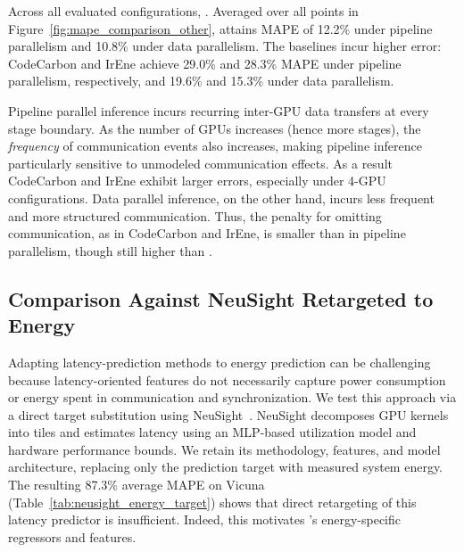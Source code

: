 Across all evaluated configurations, .
Averaged over all points in Figure~\ref{fig:mape_comparison_other}, \sys{} attains MAPE of 12.2\% under pipeline parallelism and 10.8\% under data parallelism.
The baselines incur higher error: CodeCarbon and IrEne achieve 29.0\% and 28.3\% MAPE under pipeline parallelism, respectively, and 19.6\% and 15.3\% under data parallelism.



Pipeline parallel inference incurs recurring inter-GPU data transfers at every stage boundary.
As the number of GPUs increases (hence more stages), the \emph{frequency} of communication events also increases, making pipeline inference particularly sensitive to unmodeled communication effects.
As a result CodeCarbon and IrEne exhibit larger errors, especially under 4-GPU configurations.
Data parallel inference, on the other hand, incurs less frequent and more structured communication.
Thus, the penalty for omitting communication, as in CodeCarbon and IrEne, is smaller than in pipeline parallelism, though still higher than \sys{}.



\subsection{Comparison Against NeuSight Retargeted to Energy}
Adapting latency-prediction methods to energy prediction can be challenging because latency-oriented features do not necessarily capture power consumption or energy spent in communication and synchronization.
We test this approach via a direct target substitution using NeuSight~\cite{neusight}.
NeuSight decomposes GPU kernels into tiles and estimates latency using an MLP-based utilization model and hardware performance bounds. 
We retain its methodology, features, and model architecture, replacing only the prediction target with measured system energy.
The resulting 87.3\% average MAPE on Vicuna (Table~\ref{tab:neusight_energy_target}) shows that direct retargeting of this latency predictor is insufficient.
Indeed, this motivates \sys{}'s energy-specific regressors and features.

